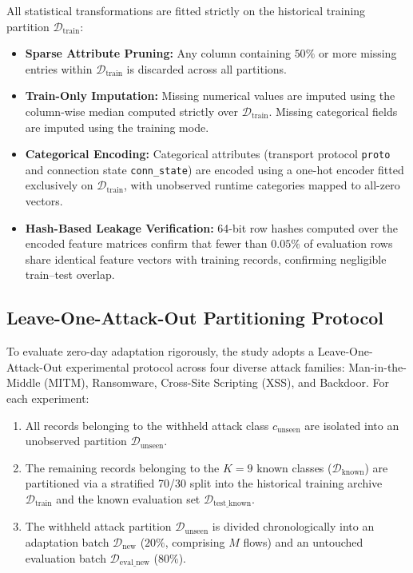 All statistical transformations are fitted strictly on the historical training partition $\mathcal{D}_{\text{train}}$:
\begin{itemize}
    \item \textbf{Sparse Attribute Pruning:} Any column containing $50\%$ or more missing entries within $\mathcal{D}_{\text{train}}$ is discarded across all partitions.
    \item \textbf{Train-Only Imputation:} Missing numerical values are imputed using the column-wise median computed strictly over $\mathcal{D}_{\text{train}}$. Missing categorical fields are imputed using the training mode.
    \item \textbf{Categorical Encoding:} Categorical attributes (transport protocol \texttt{proto} and connection state \texttt{conn\_state}) are encoded using a one-hot encoder fitted exclusively on $\mathcal{D}_{\text{train}}$, with unobserved runtime categories mapped to all-zero vectors.
    \item \textbf{Hash-Based Leakage Verification:} 64-bit row hashes computed over the encoded feature matrices confirm that fewer than $0.05\%$ of evaluation rows share identical feature vectors with training records, confirming negligible train--test overlap.
\end{itemize}

\subsection{Leave-One-Attack-Out Partitioning Protocol}
\label{subsec:leave_one_out}

To evaluate zero-day adaptation rigorously, the study adopts a Leave-One-Attack-Out experimental protocol across four diverse attack families: Man-in-the-Middle (MITM), Ransomware, Cross-Site Scripting (XSS), and Backdoor. For each experiment:
\begin{enumerate}
    \item All records belonging to the withheld attack class $c_{\text{unseen}}$ are isolated into an unobserved partition $\mathcal{D}_{\text{unseen}}$.
    \item The remaining records belonging to the $K = 9$ known classes ($\mathcal{D}_{\text{known}}$) are partitioned via a stratified 70/30 split into the historical training archive $\mathcal{D}_{\text{train}}$ and the known evaluation set $\mathcal{D}_{\text{test\_known}}$.
    \item The withheld attack partition $\mathcal{D}_{\text{unseen}}$ is divided chronologically into an adaptation batch $\mathcal{D}_{\text{new}}$ ($20\%$, comprising $M$ flows) and an untouched evaluation batch $\mathcal{D}_{\text{eval\_new}}$ ($80\%$).
\end{enumerate}

